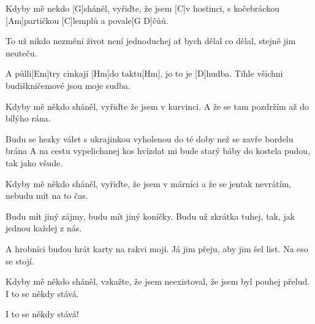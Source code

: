 
Kdyby mě nekdo [G]sháněl,
vyřiďte, že jsem [C]v hostinci,
s kočebráckou [Am]partičkou
[C]lemplů a povale[G D]\null čůů.

To už nikdo nezmění
život není jednoduchej
ať bych dělal co dělal,
stejně jim neuteču.

A půlli[Em]try
cinkají [Hm]do taktu[Hm],
jo to je [D]hudba.
Tihle všichni
budiškničemové
jsou moje sudba.

Kdyby mě někdo sháněl,
vyřiďte že jsem v kurvinci.
A že se tam pozdržím
až do bílýho rána.

Budu se hezky válet
s ukrajinkou vyholenou
do té doby než se
zavře bordelu brána
\slpc
A na cestu
vypelichanej kos
hvízdat mi bude
starý báby
do kostela pudou,
tak jako všude.

Kdyby mě někdo sháněl,
vyřiďte, že jsem v márníci
a že se jentak nevrátím,
nebudu mít na to čas.

Budu mít jiný zájmy,
budu mít jiný koníčky.
Budu už zkrátka tuhej,
tak, jak jednou každej z nás.

A hrobníci
budou hrát karty
na rakvi mojí.
Já jim přeju,
aby jim šel list.
Na eso se stojí.

Kdyby mě někdo sháněl,
vzkažte, že jsem neexistoval,
že jsem byl pouhej přelud.
I to se někdy stává.

I to se někdy stává!